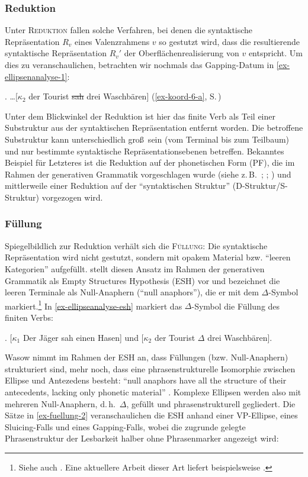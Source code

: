 \subsubsection*{Reduktion}

Unter \textsc{Reduktion} fallen solche Verfahren, bei denen die syntaktische Repräsentation $R_v$ eines Valenzrahmens $v$ so gestutzt wird, dass die resultierende syntaktische Repräsentation $R_v'$ der Oberflächenrealisierung von $v$ entspricht. Um dies zu veranschaulichen, betrachten wir nochmals das Gapping-Datum in \ref{ex-ellipsenanalyse-1}:

\ex.  \label{ex-ellipsenanalyse-1}\ldots [$\kappa_2$ der Tourist \sout{sah} drei Waschbären] \hfill (\ref{ex-koord-6-a}, S.\,\pageref{ex-koord-6-a})

Unter dem Blickwinkel der Reduktion ist hier das finite Verb als Teil einer Substruktur aus der syntaktischen Repräsentation entfernt worden. Die betroffene Substruktur kann unterschiedlich gro\ss\ sein (vom Terminal bis zum Teilbaum) und nur bestimmte syntaktische Repräsentationsebenen betreffen. Bekanntes Beispiel für Letzteres ist die Reduktion auf der phonetischen Form (PF), die im Rahmen der generativen Grammatik vorgeschlagen wurde (siehe z.\,B.\ \citealt{Klein:93}; \citealt{Hartmann:00}; \citealt{Merchant:01}) und mittlerweile einer Reduktion auf der "`syntaktischen Struktur"' (D-Struktur/S-Struktur) vorgezogen wird.

\subsubsection*{Füllung}

Spiegelbildlich zur Reduktion verhält sich die \textsc{Füllung}: Die syntaktische Repräsentation wird nicht gestutzt, sondern mit opakem Material bzw. "`leeren Kategorien"' aufgefüllt. \citet[98f]{Wasow:72} stellt diesen Ansatz im Rahmen der generativen Grammatik als Empty Structures Hypothesis (ESH) vor und bezeichnet die leeren Terminale als Null-Anaphern ("`null anaphors"'), die er mit dem  $\Delta$-Symbol markiert.\footnote{Siehe auch \cite{Wasow:79}. Eine aktuellere Arbeit dieser Art liefert beispielsweise \cite{Johnson:01}.} In \ref{ex-ellipseanalyse-esh} markiert das $\Delta$-Symbol die Füllung des finiten Verbs:  

\ex. [$\kappa_1$ Der Jäger sah einen Hasen] und [$\kappa_2$ der Tourist $\Delta$ drei Waschbären].\label{ex-ellipseanalyse-esh}

Wasow nimmt im Rahmen der ESH an, dass Füllungen (bzw. Null-Anaphern) strukturiert sind, mehr noch, dass eine phrasenstrukturelle Isomorphie zwischen Ellipse und Antezedens besteht: "`null anaphors have all the structure of their antecedents, lacking only phonetic material"' \citep[98]{Wasow:72}. Komplexe Ellipsen werden also mit mehreren Null-Anaphern, d.\,h.\ $\Delta$, gefüllt und phrasenstrukturell gegliedert. Die Sätze in \ref{ex-fuellung-2} veranschaulichen die ESH anhand einer VP-Ellipse, eines Sluicing-Falls und eines Gapping-Falls, wobei die zugrunde gelegte Phrasenstruktur der Lesbarkeit halber ohne Phrasenmarker angezeigt wird:  

